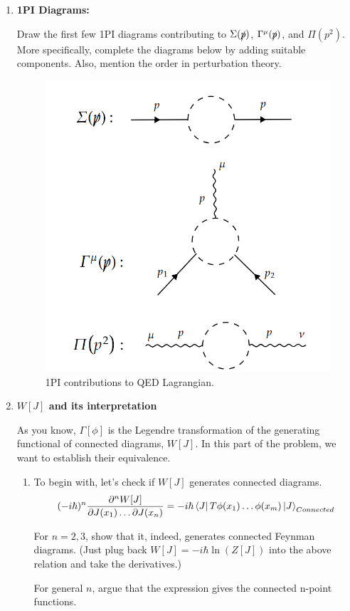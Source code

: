 \documentclass[11pt]{article}
\begin{document}
	\begin{enumerate}
		\item
		\begin{problem}{\points{-}}
			\textbf{1PI Diagrams:}
			
			\noindent
			Draw the first few 1PI diagrams contributing to $\Sigma(\slashed{p})$, $\Gamma^\mu(\slashed{p})$, and $\Pi(p^2)$. More specifically, complete the diagrams below by adding suitable components. Also, mention the order in perturbation theory.
			
			\begin{figure}[H]
				\centering
				\includegraphics[width=0.5\linewidth]{img/1.png}
				\caption{1PI contributions to QED Lagrangian.}
			\end{figure}
		\end{problem}
	
		\item
		\begin{problem}{\points{-}}
		\textbf{$W[J]$ and its interpretation}
		
	As you know, $\Gamma[\phi]$ is the Legendre transformation of the generating functional of connected diagrams, $W[J]$. In this part of the problem, we want to establish their equivalence.
	
	\begin{enumerate}
		\item To begin with, let's check if $W[J]$ generates connected diagrams.
		\[
		(-i\hbar)^n \frac{\partial^n W[J]}{\partial J(x_1)\dots \partial J(x_n)} = -i\hbar \bra{J} T{\phi(x_1) \dots \phi(x_m)}\ket{J}_{Connected}
		\]
		
		For $n=2,3$, show that it, indeed, generates connected Feynman diagrams. (Just plug back $W[J] = -i\hbar \ln(Z[J])$ into the above relation and take the derivatives.)
		
		For general $n$, argue that the expression gives the connected n-point functions.
	\end{enumerate}
	

\end{problem}
\end{enumerate}
\end{document}

